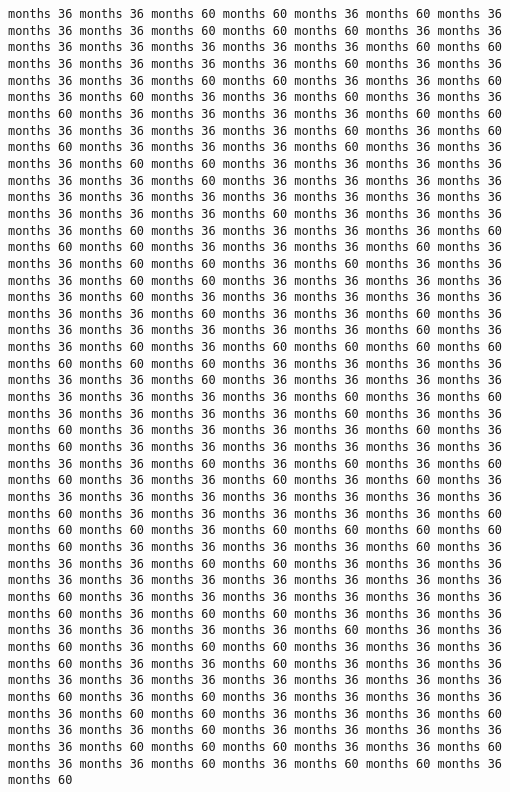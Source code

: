 \documentclass[11pt]{article}
\begin{document}
\begin{Verbatim}[commandchars=\\\{\}, frame=single, framerule=2mm, rulecolor=\color{outerrorbackground}]
months 36 months 36 months 60 months 60 months 36 months 60 months 36 months 36 months 36 months 60 months 60 months 60 months 36 months 36 months 36 months 36 months 36 months 36 months 36 months 60 months 60 months 36 months 36 months 36 months 36 months 60 months 36 months 36 months 36 months 36 months 60 months 60 months 36 months 36 months 60 months 36 months 60 months 36 months 36 months 60 months 36 months 36 months 60 months 36 months 36 months 36 months 36 months 60 months 60 months 36 months 36 months 36 months 36 months 60 months 36 months 60 months 60 months 36 months 36 months 36 months 60 months 36 months 36 months 36 months 60 months 60 months 36 months 36 months 36 months 36 months 36 months 36 months 60 months 36 months 36 months 36 months 36 months 36 months 36 months 36 months 36 months 36 months 36 months 36 months 36 months 36 months 36 months 60 months 36 months 36 months 36 months 36 months 60 months 36 months 36 months 36 months 36 months 60 months 60 months 60 months 36 months 36 months 36 months 60 months 36 months 36 months 60 months 60 months 36 months 60 months 36 months 36 months 36 months 60 months 60 months 36 months 36 months 36 months 36 months 36 months 60 months 36 months 36 months 36 months 36 months 36 months 36 months 36 months 60 months 36 months 36 months 60 months 36 months 36 months 36 months 36 months 36 months 36 months 60 months 36 months 36 months 60 months 36 months 60 months 60 months 60 months 60 months 60 months 60 months 60 months 36 months 36 months 36 months 36 months 36 months 36 months 60 months 36 months 36 months 36 months 36 months 36 months 36 months 36 months 36 months 60 months 36 months 60 months 36 months 36 months 36 months 36 months 60 months 36 months 36 months 60 months 36 months 36 months 36 months 36 months 60 months 36 months 60 months 36 months 36 months 36 months 36 months 36 months 36 months 36 months 36 months 60 months 36 months 60 months 36 months 60 months 60 months 36 months 36 months 60 months 36 months 60 months 36 months 36 months 36 months 36 months 36 months 36 months 36 months 36 months 60 months 36 months 36 months 36 months 36 months 36 months 60 months 60 months 60 months 36 months 60 months 60 months 60 months 60 months 60 months 36 months 36 months 36 months 36 months 60 months 36 months 36 months 36 months 60 months 60 months 36 months 36 months 36 months 36 months 36 months 36 months 36 months 36 months 36 months 36 months 60 months 36 months 36 months 36 months 36 months 36 months 36 months 60 months 36 months 60 months 60 months 36 months 36 months 36 months 36 months 36 months 36 months 36 months 60 months 36 months 36 months 60 months 36 months 60 months 60 months 36 months 36 months 36 months 60 months 36 months 36 months 60 months 36 months 36 months 36 months 36 months 36 months 36 months 36 months 36 months 36 months 36 months 60 months 36 months 60 months 36 months 36 months 36 months 36 months 36 months 60 months 60 months 36 months 36 months 36 months 60 months 36 months 36 months 60 months 36 months 36 months 36 months 36 months 36 months 60 months 60 months 60 months 36 months 36 months 60 months 36 months 36 months 60 months 36 months 60 months 60 months 36 months 60 
\end{Verbatim}
\end{document}
